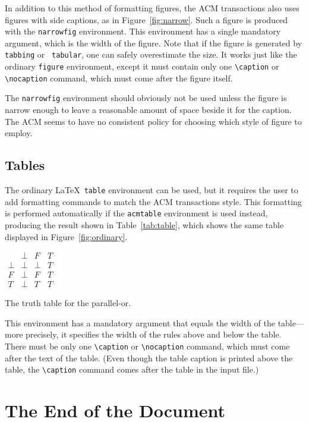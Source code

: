 \documentclass[acmtocl]{acmtrans2m}
\begin{document}
In addition to this method of formatting figures, the ACM transactions
also uses figures with side captions, as in Figure~\ref{fig:narrow}.
Such a figure is produced with the {\tt narrowfig} environment.  This
environment has a single mandatory argument, which is the width of the
figure.
Note that if the figure is generated by {\tt tabbing} or {\tt
tabular}, one can safely overestimate the size.
It works just like the ordinary {\tt figure} environment,
except it must contain only one \verb|\caption| or \verb|\nocaption|
command, which must come after the figure itself.  

The {\tt narrowfig} environment should obviously not be used unless
the figure is narrow enough to leave a reasonable amount of space
beside it for the caption.  The ACM seems to have no consistent policy
for choosing which style of figure to employ.

\subsection{Tables}

The ordinary \LaTeX\ {\tt table} environment can be used, but it
requires the user to add formatting commands to match the ACM
transactions style.  This formatting is performed automatically
if the {\tt acmtable} environment is used instead, producing
the result shown in Table~\ref{tab:table}, which shows the same
table displayed in Figure~\ref{fig:ordinary}.
\begin{acmtable}{100pt}
\centering
\(\begin{array}{c|ccc}
     & \bot & F & T \\
\hline
\bot & \bot & \bot & T \\
F    & \bot & F    & T \\
T    & \bot & T    & T
\end{array}\)
\caption{The truth table for the parallel-or.}
\label{tab:table}
\end{acmtable}
This environment has a mandatory argument that equals the width
of the table---more precisely, it specifies the width of the rules
above and below the table.  There must be only one 
\verb|\caption| or \verb|\nocaption|
command, which must come after the text of the table.  
(Even though the table caption is printed above the table, the
\verb|\caption| command comes after the table in the input file.)


\section{The End of the Document}
\end{document}
